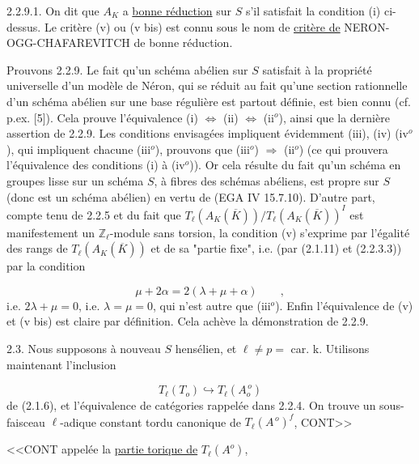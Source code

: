 2.2.9.1. On dit que $A_K$ a \underline{bonne réduction} sur $S$ s'il satisfait la condition (i) ci-dessus. Le critère (v) ou (v bis) est connu sous le nom de \underline{critère de} NERON-OGG-CHAFAREVITCH de bonne réduction.



Prouvons 2.2.9. Le fait qu'un schéma abélien sur $S$ satisfait à la propriété universelle d'un modèle de Néron, qui se réduit au fait qu'une section rationnelle d'un schéma abélien sur une base régulière est partout définie, est bien connu (cf. p.ex. [5]). Cela prouve l'équivalence (i) $\Longleftrightarrow$ (ii) $\Longleftrightarrow$ (ii$^o$), ainsi que la dernière assertion de 2.2.9. Les conditions envisagées impliquent évidemment (iii), (iv) (iv$^o$), qui impliquent chacune (iii$^o$), prouvons que (iii$^o$) $\Longrightarrow$ (ii$^o$) (ce qui prouvera l'équivalence des conditions (i) à (iv$^o$)). Or cela résulte du fait qu'un schéma en groupes lisse sur un schéma $S$, à fibres des schémas abéliens, est propre sur $S$ (donc est un schéma abélien) en vertu de (EGA IV 15.7.10). D'autre part, compte tenu de 2.2.5 et du fait que $T_\ell(A_K(\overline{K}))/T_\ell(A_K(\overline{K}))^I$ est manifestement un $\mathbb{Z}_\ell$-module sans torsion, la condition (v) s'exprime par l'égalité des rangs de $T_\ell(A_K(\overline{K}))$ et de sa "partie fixe", i.e. (par (2.1.11) et (2.2.3.3)) par la condition

\begin{equation*}
\mu + 2\alpha = 2(\lambda + \mu + \alpha) \qquad ,
\end{equation*}
i.e. $2\lambda + \mu = 0$, i.e. $\lambda = \mu = 0$, qui n'est autre que (iii$^o$). Enfin l'équivalence de (v) et (v bis) est claire par définition. Cela achève la démonstration de 2.2.9.

2.3. Nous supposons à nouveau $S$ hensélien, et $\ell \neq p =$ car. k. Utilisons maintenant l'inclusion

\begin{equation}\tag{2.3.1}
T_\ell(T_o) \hookrightarrow T_\ell(A_o^{\,o})
\end{equation}
de (2.1.6), et l'équivalence de catégories rappelée dans 2.2.4. On trouve un sous-faisceau $\ell$-adique constant tordu canonique de $T_\ell(A^{\,o})^f$, CONT>>



<<CONT appelée la \underline{partie torique de} $T_\ell(A^o)$,


